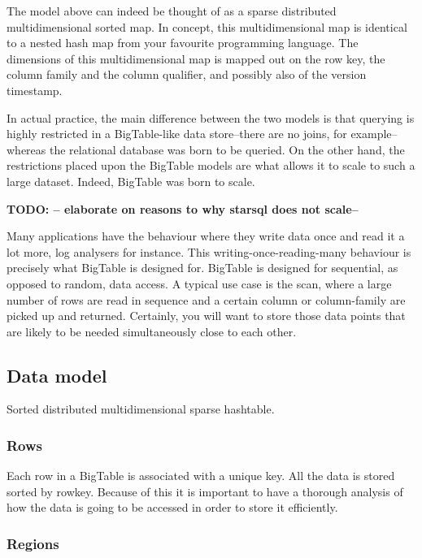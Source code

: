 \documentclass[a4paper,10pt]{book}
\begin{document}
The model above can indeed be thought of as a sparse distributed
multidimensional sorted map. In concept, this multidimensional map is
identical to a nested hash map from your favourite programming language. The
dimensions of this multidimensional map is mapped out on the row key, the
column family and the column qualifier, and possibly also of the version
timestamp.

In actual practice, the main difference between the two models is that
querying is highly restricted in a BigTable-like data store--there are no
joins, for example--whereas the relational database was born to be queried.
On the other hand, the restrictions placed upon the BigTable models are
what allows it to scale to such a large dataset. Indeed, BigTable was born
to scale.

\textbf{TODO: -- elaborate on reasons to why starsql does not scale--}

Many applications have the behaviour where they write data once and read it
a lot more, log analysers for instance. This writing-once-reading-many
behaviour is precisely what BigTable is designed for. BigTable is designed
for sequential, as opposed to random, data access. A typical use case is
the scan, where a large number of rows are read in sequence and a certain
column or column-family are picked up and returned. Certainly, you will
want to store those data points that are likely to be needed simultaneously
close to each other. \cite{bigtable}


\subsection{Data model}

Sorted distributed multidimensional sparse hashtable.


\subsubsection{Rows}

Each row in a BigTable is associated with a unique key. All the data is
stored sorted by rowkey. Because of this it is important to have a thorough
analysis of how the data is going to be accessed in order to store it
efficiently.



\subsubsection{Regions}
\end{document}
